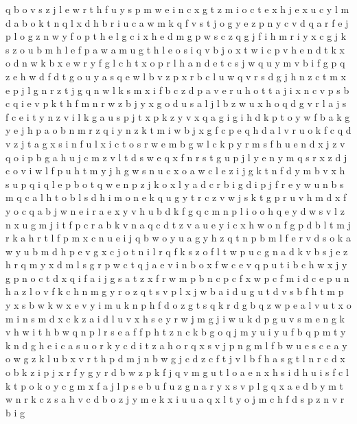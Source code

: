 \documentclass{article}
\begin{document}
q b o v s z j l e w r t h f u y
s p m w e i n c x g t
z m i o c t e x
h j e x u c y l m d a b o k t n q
l x d h b r i u c a w m k q f v s t j o g y e z p n
y c v d q a r f e j p l o
g z n w
y f o p t h e l g c i
x h e d m g p w s c z q
g j f i h m
r i y x c g j k s z o u b m h l e f p a
w a m u g t h l e o s i q v
b j o x t w i c p v h e n d
t k x o d n w
k b x e w r y f g l c h t
x o p r l h a n d e t c s j w q u y m v b i f
g p q z e h w d
f d t g o u y a s q e w l b v z p x r
b c l
u w q v r s d g j h n z c t m x e
p j l g n r z
t j g q n w l k s m x i f b c z d p a v e r u h o
t
t a j i x n c v p s b
c q i e v p k t h f m n r w z b j y x g o d u s a l
j l
b z w u x h o q d g v r l a j s f c e i t y n
z v i l k g a u s p j t x
p k z y v x q a g i
g i h d k p t o y w f
b a
k g y e j h p a o b n m r z q i
y n z k t m i w b j x g f c p e q h d a l v r u o
k f c q d v z j t a g x s i
n f u l x i c t o s r w e m b g
w l c k p y r m s f h u e n d x j z v q o i
p b g a h u j c m z v l t d s w e q x f n r
s t g u p j l y
e n y m q s r x z d j c o v i w l f p u h t
m y j h g w s n u c x
o a w c l e z i j g k t n f d y m b v x h s u p q
i q l e p b o
t q w e n p z j k o x l y a d c r b i
g d i p j f r e y w u n b s m q c a l h t o
b l s d h i m o n e k q u g y t r c z v w j
s k t g p r u v h m d x f y o c q a b j w n e i
r a e x y v h u b d k f g q c m n p l i o
o h q e y d w s v l z n x u g m j i t f p c r a b k
v n a q c d t
z v a u e y i c x h w o n f g p d b l t m j r k
a h r t l f p m x c n u e i j q b w o y
u a g y h z q t n p b m l f e r v d s o k
a w y u b m d h p e v g x c j o t n i l r q f k s z
o f l t w p u c g n a d k v b s j e z h r q m y x
d m l s g r p w c t q j a e v i n b o x f
w c e v q p u t
i b c h w x j y
g p n o c t d x q i f a
i j g s a t z x f r w m p b n c
p c f
x w p c f m i
d c e p u n h a z l o v f
k c h n m g y r o z q t s v p l x j w b a i d u
g u t d v s b f
h t m p y x s b w k
w x e v y i m u k n p h f d o z g t s q
k r d g b q z w p e a l v u t x o m i n s
m
d x c
k z a i d l u v x h s e y r w j m g
j i w u k d p
g u v s m
e n g k v h w i t
h b w q n p l r s e a f
f p h t z n c k b g o q j m y u i
y u f
b q p m t y k n d g h e i c a s u o r
k y c d i t z a h o r q x s v j p n g m l f b w u e
s c e a y o w g z k l u b x v r t h p d m j n
b w g j c d
z c f t j v l b
f h a s g t l n r c d x o b k z i
p j x r f y g
y r d b w z p k f j q v m g u t l o a e n x h s i
d h
u i s f c l k t p o
k o y c g m x f a j l p s e b u
f u z g n a r y x
s v p l g q x a e d b y m t w n r k c z
s a h v c d b o z j y m e k x i u
u a q x l t y o j m c h f d s p z n v r b i g
\end{document}
